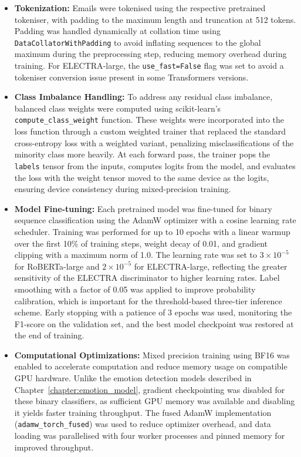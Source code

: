 \begin{itemize}
	\item \textbf{Tokenization:} Emails were tokenised using the respective pretrained tokeniser, with padding to the maximum length and truncation at 512 tokens. Padding was handled dynamically at collation time using \texttt{DataCollatorWithPadding} to avoid inflating sequences to the global maximum during the preprocessing step, reducing memory overhead during training. For \acs{ELECTRA}-large, the \texttt{use\_fast=False} flag was set to avoid a tokeniser conversion issue present in some Transformers versions.

	\item \textbf{Class Imbalance Handling:} To address any residual class imbalance, balanced class weights were computed using scikit-learn's \texttt{compute\_class\_weight} function. These weights were incorporated into the loss function through a custom weighted trainer that replaced the standard cross-entropy loss with a weighted variant, penalizing misclassifications of the minority class more heavily. At each forward pass, the trainer pops the \texttt{labels} tensor from the inputs, computes logits from the model, and evaluates the loss with the weight tensor moved to the same device as the logits, ensuring device consistency during mixed-precision training.

	\item \textbf{Model Fine-tuning:} Each pretrained model was fine-tuned for binary sequence classification using the \ac{AdamW} optimizer \cite{loshchilov2019decoupled} with a cosine learning rate scheduler. Training was performed for up to 10 epochs with a linear warmup over the first 10\% of training steps, weight decay of 0.01, and gradient clipping with a maximum norm of 1.0. The learning rate was set to $3 \times 10^{-5}$ for \acs{RoBERTa}-large and $2 \times 10^{-5}$ for \acs{ELECTRA}-large, reflecting the greater sensitivity of the ELECTRA discriminator to higher learning rates. Label smoothing with a factor of 0.05 was applied to improve probability calibration, which is important for the threshold-based three-tier inference scheme. Early stopping with a patience of 3 epochs was used, monitoring the F1-score on the validation set, and the best model checkpoint was restored at the end of training.

	\item \textbf{Computational Optimizations:} Mixed precision training using \ac{BF16} \cite{micikevicius2018mixed} was enabled to accelerate computation and reduce memory usage on compatible \ac{GPU} hardware. Unlike the emotion detection models described in Chapter~\ref{chapter:emotion_model}, gradient checkpointing was disabled for these binary classifiers, as sufficient \ac{GPU} memory was available and disabling it yields faster training throughput. The fused AdamW implementation (\texttt{adamw\_torch\_fused}) was used to reduce optimizer overhead, and data loading was parallelised with four worker processes and pinned memory for improved throughput.


\end{itemize}
